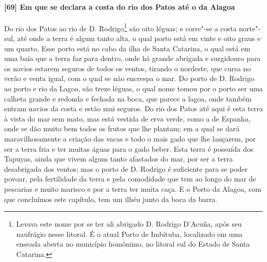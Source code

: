 \begin{linenumbers}
\paragraph{[69] Em que se declara a costa do rio dos Patos até o da Alagoa} \quad
Do rio dos Patos ao rio de D. Rodrigo\footnote{ Levava este nome por se ter ali abrigado
D. Rodrigo D’Acuña, após seu naufrágio nesse litoral. É o atual Porto de Imbituba,
localizado em uma enseada aberta no município homônimo, no litoral sul do Estado de Santa
Catarina.} são oito léguas; e corre"-se a costa norte"-sul, até onde a terra é algum tanto
alta, o qual porto está em vinte e oito graus e um quarto. Esse porto está no cabo da ilha
de Santa Catarina, o qual está em uma baía que a terra faz para dentro, onde há grande
abrigada e surgidouro para os navios estarem seguros de todos os ventos, tirando o
nordeste, que cursa no verão e venta igual, com o qual se não encrespa o mar. Do porto de
D. Rodrigo ao porto e rio da Lagoa, são treze léguas, o qual nome tomou por o porto ser
uma calheta grande e redonda e fechada na boca, que parece a lagoa, onde também entram
navios da costa e estão mui seguros. Do rio dos Patos até aqui é esta terra à vista do mar
sem mato, mas está vestida de erva verde, como a de Espanha, onde se dão muito bem todos
os frutos que lhe plantam; em a qual se dará maravilhosamente a criação das vacas e todo o
mais gado que lhe lançarem, por ser a terra fria e ter muitas águas para o gado beber.
Esta terra é possuída dos Tapuyas, ainda que vivem algum tanto afastados do mar, por ser a
terra desabrigada dos ventos; mas o porto de D. Rodrigo é suficiente para se poder povoar,
pela fertilidade da terra e pela comodidade que tem ao longo do mar de pescarias e muito
marisco e por a terra ter muita caça. E o Porto da Alagoa, com que concluímos este
capítulo, tem um ilhéu junto da boca da barra.


\end{linenumbers}
